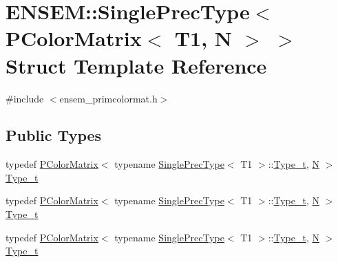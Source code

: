 \hypertarget{structENSEM_1_1SinglePrecType_3_01PColorMatrix_3_01T1_00_01N_01_4_01_4}{}\section{E\+N\+S\+EM\+:\+:Single\+Prec\+Type$<$ P\+Color\+Matrix$<$ T1, N $>$ $>$ Struct Template Reference}
\label{structENSEM_1_1SinglePrecType_3_01PColorMatrix_3_01T1_00_01N_01_4_01_4}


{\ttfamily \#include $<$ensem\+\_\+primcolormat.\+h$>$}

\subsection*{Public Types}
\begin{DoxyCompactItemize}
\item 
typedef \mbox{\hyperlink{classENSEM_1_1PColorMatrix}{P\+Color\+Matrix}}$<$ typename \mbox{\hyperlink{structENSEM_1_1SinglePrecType}{Single\+Prec\+Type}}$<$ T1 $>$\+::\mbox{\hyperlink{structENSEM_1_1SinglePrecType_3_01PColorMatrix_3_01T1_00_01N_01_4_01_4_a75f8a27b94fdcd735897c0556a26c7e3}{Type\+\_\+t}}, \mbox{\hyperlink{adat__devel_2lib_2hadron_2operator__name__util_8cc_a7722c8ecbb62d99aee7ce68b1752f337}{N}} $>$ \mbox{\hyperlink{structENSEM_1_1SinglePrecType_3_01PColorMatrix_3_01T1_00_01N_01_4_01_4_a75f8a27b94fdcd735897c0556a26c7e3}{Type\+\_\+t}}
\item 
typedef \mbox{\hyperlink{classENSEM_1_1PColorMatrix}{P\+Color\+Matrix}}$<$ typename \mbox{\hyperlink{structENSEM_1_1SinglePrecType}{Single\+Prec\+Type}}$<$ T1 $>$\+::\mbox{\hyperlink{structENSEM_1_1SinglePrecType_3_01PColorMatrix_3_01T1_00_01N_01_4_01_4_a75f8a27b94fdcd735897c0556a26c7e3}{Type\+\_\+t}}, \mbox{\hyperlink{adat__devel_2lib_2hadron_2operator__name__util_8cc_a7722c8ecbb62d99aee7ce68b1752f337}{N}} $>$ \mbox{\hyperlink{structENSEM_1_1SinglePrecType_3_01PColorMatrix_3_01T1_00_01N_01_4_01_4_a75f8a27b94fdcd735897c0556a26c7e3}{Type\+\_\+t}}
\item 
typedef \mbox{\hyperlink{classENSEM_1_1PColorMatrix}{P\+Color\+Matrix}}$<$ typename \mbox{\hyperlink{structENSEM_1_1SinglePrecType}{Single\+Prec\+Type}}$<$ T1 $>$\+::\mbox{\hyperlink{structENSEM_1_1SinglePrecType_3_01PColorMatrix_3_01T1_00_01N_01_4_01_4_a75f8a27b94fdcd735897c0556a26c7e3}{Type\+\_\+t}}, \mbox{\hyperlink{adat__devel_2lib_2hadron_2operator__name__util_8cc_a7722c8ecbb62d99aee7ce68b1752f337}{N}} $>$ \mbox{\hyperlink{structENSEM_1_1SinglePrecType_3_01PColorMatrix_3_01T1_00_01N_01_4_01_4_a75f8a27b94fdcd735897c0556a26c7e3}{Type\+\_\+t}}
\end{DoxyCompactItemize}



